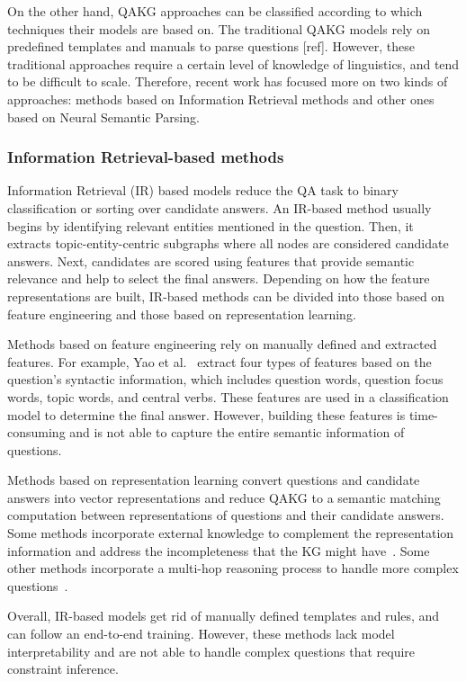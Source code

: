 On the other hand, QAKG approaches can be classified according to which techniques their models 
are based on. The traditional QAKG models rely on predefined templates and manuals to parse 
questions [ref]. However, these traditional approaches require a certain level of knowledge of 
linguistics, and tend to be difficult to scale. Therefore, recent work has focused more on two 
kinds of approaches: methods based on Information Retrieval methods and other ones based on 
Neural Semantic Parsing.

\subsubsection{Information Retrieval-based methods}
\label{cap2:qakg/approaches/infRetrieval}
Information Retrieval (IR) based models reduce the QA task to binary classification or sorting 
over candidate answers. An IR-based method usually begins by identifying relevant entities 
mentioned in the question. Then, it extracts topic-entity-centric subgraphs where all nodes are 
considered candidate answers. Next, candidates are scored using features that provide semantic 
relevance and help to select the final answers. Depending on how the feature representations 
are built, IR-based methods can be divided into those based on feature engineering and those 
based on representation learning.

Methods based on feature engineering rely on manually defined and extracted features. For 
example, Yao et al.~\cite{qa:YaoD14} extract four types of features based on the question’s 
syntactic information, which includes question words, question focus words, topic words, and 
central verbs. These features are used in a classification model to determine the final answer. 
However, building these features is time-consuming and is not able to capture the entire 
semantic information of questions.

Methods based on representation learning convert questions and candidate answers into vector 
representations and reduce QAKG to a semantic matching computation between representations of 
questions and their candidate answers. Some methods incorporate external knowledge to complement 
the representation information and address the incompleteness that the KG might 
have~\cite{qa:XuRFHZ16,qa:SunDZMSC18,qa:TrouillonWRGB16}. Some other methods incorporate a 
multi-hop reasoning process to handle more complex questions~\cite{qa:SukhbaatarSWF15,qa:MillerFDKBW16,qa:QiuWJZ20}.

Overall, IR-based models get rid of manually defined templates and rules, and can follow an 
end-to-end training. However, these methods lack model interpretability and are not able to 
handle complex questions that require constraint inference.

